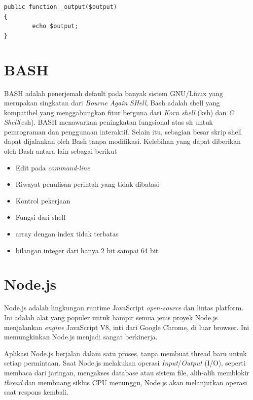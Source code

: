     \begin{lstlisting}[basicstyle=\ttfamily, frame=single,
        columns=fullflexible, breaklines=true, numbers=none]
public function _output($output)
{
        echo $output;
}
    \end{lstlisting} 

\section{BASH}
\label{sec:BASH}
BASH adalah penerjemah default pada banyak sistem GNU/Linux yang merupakan singkatan dari \textit{Bourne Again SHell}, Bash adalah  shell yang kompatibel yang menggabungkan fitur berguna dari \textit{Korn shell} (ksh) dan \textit{C Shell}(csh)\cite{gnu}. BASH menawarkan peningkatan fungsional atas sh untuk pemrograman dan penggunaan interaktif. Selain itu, sebagian besar skrip shell dapat dijalankan oleh Bash tanpa modifikasi. Kelebihan yang dapat diberikan oleh Bash antara lain sebagai berikut
\begin{itemize}
    \item Edit pada \textit{command-line}
    \item Riwayat penulisan perintah yang tidak dibatasi
    \item Kontrol pekerjaan
    \item Fungsi dari shell
    \item array dengan index tidak terbatas
    \item bilangan integer dari hanya 2 bit sampai 64 bit
\end{itemize}

\section{Node.js}
\label{sec: Node.js}
Node.js adalah lingkungan runtime JavaScript \textit{open-source} dan lintas platform\cite{nodejs}. Ini adalah alat yang populer untuk hampir semua jenis proyek Node.js menjalankan \textit{engine} JavaScript V8, inti dari Google Chrome, di luar browser. Ini memungkinkan Node.js menjadi sangat berkinerja.

Aplikasi Node.js berjalan dalam satu proses, tanpa membuat thread baru untuk setiap permintaan.
Saat Node.js melakukan operasi \textit{Input}/\textit{Output} (I/O), seperti membaca dari jaringan, mengakses database atau sistem file, alih-alih memblokir \textit{thread} dan membuang siklus CPU menunggu, Node.js akan melanjutkan operasi saat respons kembali.

